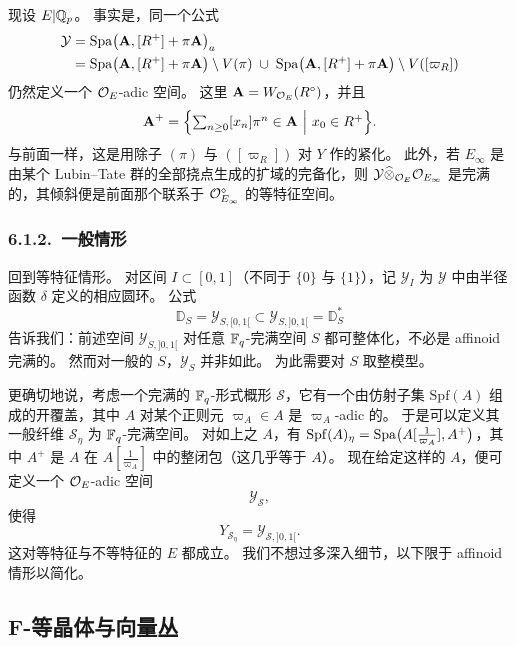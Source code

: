 现设 $E|\mathbb{Q}_p$。
事实是，同一个公式
\[
\begin{aligned}
\mathcal{Y}&=\mathrm{Spa}\bigl(\mathbf{A},[R^+]+\pi\mathbf{A}\bigr)_a\\
&=\mathrm{Spa}\bigl(\mathbf{A},[R^+]+\pi\mathbf{A}\bigr)\setminus V(\pi)
\;\cup\;\mathrm{Spa}\bigl(\mathbf{A},[R^+]+\pi\mathbf{A}\bigr)\setminus V([\varpi_R])
\end{aligned}
\]
仍然定义一个 $\mathcal{O}_E$-adic 空间。
这里 $\mathbf{A}=W_{\mathcal{O}_E}(R^\circ)$，并且
\[
\mathbf{A}^+=\Bigl\{\textstyle\sum_{n\ge0}[x_n]\pi^n\in\mathbf{A}\ \Big|\ x_0\in R^+\Bigr\}.
\]
与前面一样，这是用除子 $(\pi)$ 与 $([\varpi_R])$ 对 $Y$ 作的紧化。
此外，若 $E_\infty$ 是由某个 Lubin--Tate 群的全部挠点生成的扩域的完备化，则 $\mathcal{Y}\widehat{\otimes}_{\mathcal{O}_E}\mathcal{O}_{E_\infty}$ 是完满的，其倾斜便是前面那个联系于 $\mathcal{O}_{E_\infty}^\diamond$ 的等特征空间。

\subsubsection*{6.1.2.\ 一般情形}

回到等特征情形。
对区间 $I\subset[0,1]$（不同于 $\{0\}$ 与 $\{1\}$），记 $\mathcal{Y}_I$ 为 $\mathcal{Y}$ 中由半径函数 $\delta$ 定义的相应圆环。
公式
\[
\mathbb{D}_S=\mathcal{Y}_{S,[0,1[}\subset\mathcal{Y}_{S,]0,1[}=\mathbb{D}_S^*
\]
告诉我们：前述空间 $\mathcal{Y}_{S,]0,1[}$ 对任意 $\mathbb{F}_q$-完满空间 $S$ 都可整体化，不必是 affinoid 完满的。
然而对一般的 $S$，$\mathcal{Y}_S$ 并非如此。
为此需要对 $S$ 取整模型。

更确切地说，考虑一个完满的 $\mathbb{F}_q$-形式概形 $\mathcal{S}$，它有一个由仿射子集 $\mathrm{Spf}(A)$ 组成的开覆盖，其中 $A$ 对某个正则元 $\varpi_A\in A$ 是 $\varpi_A$-adic 的。
于是可以定义其一般纤维 $\mathcal{S}_\eta$ 为 $\mathbb{F}_q$-完满空间。
对如上之 $A$，有 $\mathrm{Spf}(A)_\eta=\mathrm{Spa}\bigl(A[\tfrac{1}{\varpi_A}],A^+\bigr)$，其中 $A^+$ 是 $A$ 在 $A[\tfrac{1}{\varpi_A}]$ 中的整闭包（这几乎等于 $A$）。
现在给定这样的 $A$，便可定义一个 $\mathcal{O}_E$-adic 空间
\[
\mathcal{Y}_{\mathcal{S}},
\]
使得
\[
Y_{\mathcal{S}_\eta}=\mathcal{Y}_{\mathcal{S},]0,1[}.
\]
这对等特征与不等特征的 $E$ 都成立。
我们不想过多深入细节，以下限于 affinoid 情形以简化。

\subsection{F-等晶体与向量丛}
\label{sec:fisoc-isocrystals}

